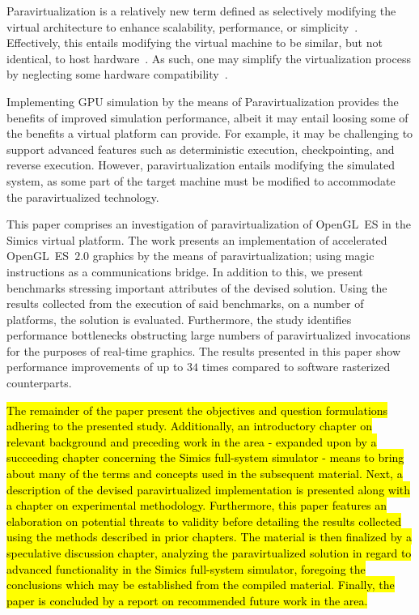 Paravirtualization is a relatively new term defined as selectively modifying the virtual architecture to enhance scalability, performance, or simplicity~.
Effectively, this entails modifying the virtual machine to be similar, but not identical, to host hardware~.
As such, one may simplify the virtualization process by neglecting some hardware compatibility~.

Implementing GPU simulation by the means of Paravirtualization provides the benefits of improved simulation performance, albeit it may entail loosing some of the benefits a virtual platform can provide.
For example, it may be challenging to support advanced features such as deterministic execution, checkpointing, and reverse execution.
However, paravirtualization entails modifying the simulated system, as some part of the target machine must be modified to accommodate the paravirtualized technology.

This paper comprises an investigation of paravirtualization of OpenGL~ES in the Simics virtual platform.
The work presents an implementation of accelerated OpenGL~ES~$2.0$ graphics by the means of paravirtualization; using magic instructions as a communications bridge.
In addition to this, we present benchmarks stressing important attributes of the devised solution.
Using the results collected from the execution of said benchmarks, on a number of platforms, the solution is evaluated.
Furthermore, the study identifies performance bottlenecks obstructing large numbers of paravirtualized invocations for the purposes of real-time graphics.
The results presented in this paper show performance improvements of up to $34$ times compared to software rasterized counterparts.


\hl{The remainder of the paper present the objectives and question formulations adhering to the presented study.
Additionally, an introductory chapter on relevant background and preceding work in the area - expanded upon by a succeeding chapter concerning the Simics full-system simulator - means to bring about many of the terms and concepts used in the subsequent material.
Next, a description of the devised paravirtualized implementation is presented along with a chapter on experimental methodology.
Furthermore, this paper features an elaboration on potential threats to validity before detailing the results collected using the methods described in prior chapters.
The material is then finalized by a speculative discussion chapter, analyzing the paravirtualized solution in regard to advanced functionality in the Simics full-system simulator, foregoing the conclusions which may be established from the compiled material.
Finally, the paper is concluded by a report on recommended future work in the area.}
